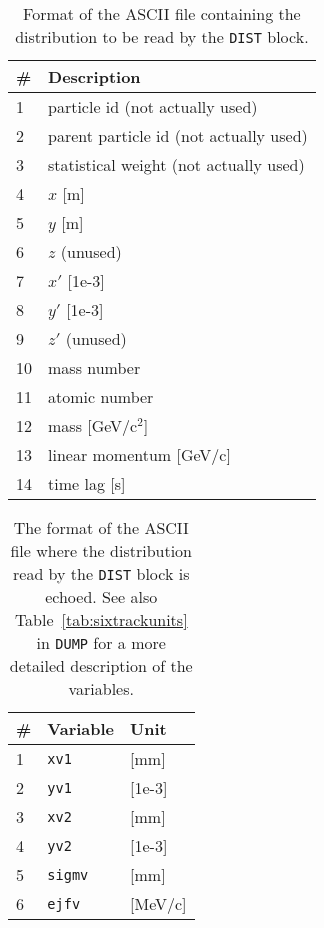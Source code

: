 \begin{center}
\begin{longtable}{|l|l|}%
    \caption{Format of the ASCII file containing the distribution to be read by the \texttt{DIST} block.}
    \label{tab:distReadFileColumns} \\*
    \hline
    \rowcolor{blue!30}
    \# & Description \\*
    \hline
    \endfirsthead
    1  & particle id (not actually used) \\*
    2  & parent particle id (not actually used) \\*
    3  & statistical weight (not actually used) \\*
    4  & $x$ [m] \\*
    5  & $y$ [m] \\*
    6  & $z$ (unused) \\*
    7  & $x'$ [1e-3] \\*
    8  & $y'$ [1e-3] \\*
    9  & $z'$ (unused) \\*
    10 & mass number \\*
    11 & atomic number \\*
    12 & mass [GeV/c$^2$] \\*
    13 & linear momentum [GeV/c] \\*
    14 & time lag [s] \\*
    \hline
\end{longtable}
\end{center}
\begin{center}
\begin{longtable}{|l|l|l|}
    \caption{The format of the ASCII file where the distribution read by the \texttt{DIST} block is echoed. See also Table~\ref{tab:sixtrackunits} in \texttt{DUMP} for a more detailed description of the variables.}
    \label{tab:distEchoFileColumns} \\*
    \hline
    \rowcolor{blue!30}
    \# & Variable & Unit\\*
    \hline
    \endfirsthead
    1  & \texttt{xv1}   & [mm]    \\*
    2  & \texttt{yv1}   & [1e-3]  \\*
    3  & \texttt{xv2}   & [mm]    \\*
    4  & \texttt{yv2}   & [1e-3]  \\*
    5  & \texttt{sigmv} & [mm]    \\*
    6  & \texttt{ejfv}  & [MeV/c] \\*
    \hline
\end{longtable}
\end{center}

